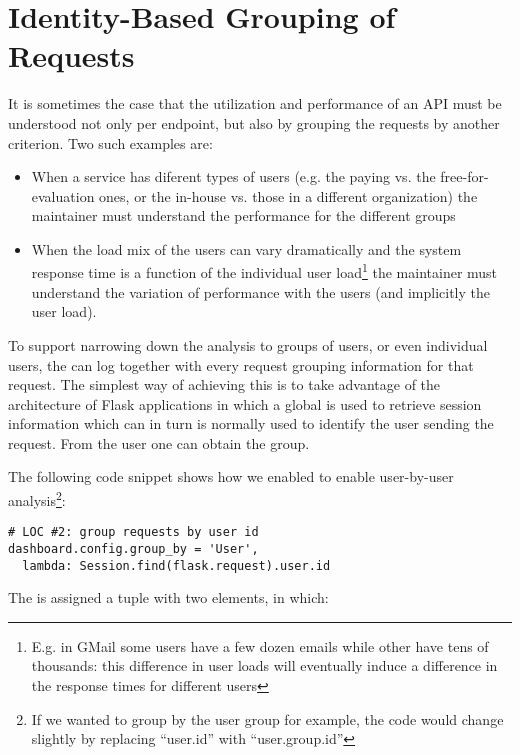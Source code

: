 
\section{Identity-Based Grouping of Requests}
\label{sec:grouping}

It is sometimes the case that the utilization and performance of an API must be understood not only per endpoint, but also by grouping the requests by another criterion. Two such examples are: 
\begin{itemize}
	\item When a service has diferent types of users (e.g. the paying vs. the free-for-evaluation ones, or the in-house vs. those in a different organization) the maintainer must understand the performance for the different groups
	\item When the load mix of the users can vary dramatically and the system response time is a function of the individual user load\footnote{E.g. in GMail some users have a few dozen emails while other have tens of thousands: this difference in user loads will eventually induce a difference in the response times for different users} the maintainer must understand the variation of performance with the users (and implicitly the user load).
\end{itemize}

To support narrowing down the analysis to groups of users, or even individual users, the \tool can log together with every request grouping information for that request. The simplest way of achieving this is to take advantage of the architecture of Flask applications in which a global  is used to retrieve session information which can in turn is normally used to identify the user sending the request. From the user one can obtain the group. 


The following code snippet shows how we enabled \tool to enable user-by-user analysis\footnote{If we wanted to group by the user group for example, the code would change slightly by replacing ``user.id'' with ``user.group.id''}: 

\begin{lstlisting}[style=custompython]  
# LOC #2: group requests by user id
dashboard.config.group_by = 'User',
  lambda: Session.find(flask.request).user.id

\end{lstlisting}

The  is assigned a tuple with two elements, in which:  


